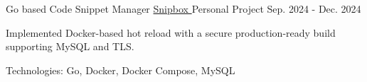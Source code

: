 
\begin{cventries}


  \cventry
    {Go based Code Snippet Manager}
    {\href{https://github.com/nmdra/snipbox}{Snipbox \faGithub}}
    {Personal Project}
    {Sep. 2024 - Dec. 2024}
    {
      \begin{cvitems}
        \item {Implemented Docker-based hot reload with a secure production-ready build supporting MySQL and TLS.}
        \item {Technologies: Go, Docker, Docker Compose, MySQL}
      \end{cvitems}
    }




\end{cventries}
